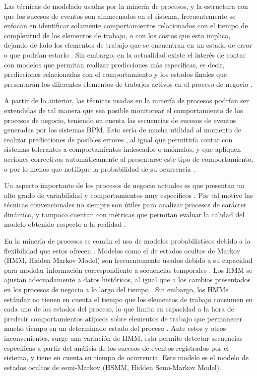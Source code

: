 Las técnicas de modelado usadas por la minería de procesos, y la estructura con que los sucesos de eventos son almacenados en el sistema, frecuentemente se enfocan en identificar solamente comportamientos relacionados con el tiempo de completitud de los elementos de trabajo, o con los costos que esto implica, dejando de lado los elementos de trabajo que se encuentran en un estado de error o que podrían estarlo \cite{VanDerAalst2011}. Sin embargo, en la actualidad existe el interés de contar con modelos que permitan realizar predicciones más específicas, es decir, predicciones relacionadas con el comportamiento y los estados finales que presentarán los diferentes elementos de trabajos activos en el proceso de negocio \cite{Camara2015}. 

A partir de lo anterior, las técnicas usadas en la minería de procesos podrían ser extendidas de tal manera que sea posible monitorear el comportamiento de los procesos de negocio, teniendo en cuenta las secuencias de sucesos de eventos generadas por los sistemas BPM. Esto sería de mucha utilidad al momento de realizar predicciones de posibles errores \cite{Kang2014}, al igual que permitiría contar con sistemas tolerantes a comportamientos indeseados o anómalos, y que apliquen acciones correctivas automáticamente al presentarse este tipo de comportamiento, o por lo menos que notifique la probabilidad de su ocurrencia \cite{Salfner2007,Yu2006}.

Un aspecto importante de los procesos de negocio actuales es que presentan un alto grado de variabilidad y comportamientos muy específicos \cite{Ferreira2007}. Por tal motivo las técnicas convencionales no siempre son útiles para analizar procesos de carácter dinámico, y tampoco cuentan con métricas que permitan evaluar la calidad del modelo obtenido respecto a la realidad \cite{Rozinat2008}.

En la minería de procesos es común el uso de modelos probabilísticos debido a la flexibilidad que estos ofrecen \cite{DaSilva2009}. Modelos como el de estados ocultos de Markov (HMM, Hidden Markov Model) son frecuentemente usados debido a su capacidad para modelar información correspondiente a secuencias temporales \cite{DaSilva2009}. Los HMM se ajustan adecuadamente a datos históricos, al igual que a los cambios presentados en los procesos de negocio a lo largo del tiempo \cite{Rozinat2008}. Sin embargo, los HMMs estándar no tienen en cuenta el tiempo que los elementos de trabajo consumen en cada uno de los estados del proceso, lo que limita su capacidad a la hora de predecir comportamientos atípicos sobre elementos de trabajo que permanecer mucho tiempo en un determinado estado del proceso \cite{DaSilva2009}. Ante estos y otros inconvenientes, surge una variación de HMM, esta permite detectar secuencias específicas a partir del análisis de los sucesos de eventos registrados por el sistema, y tiene en cuenta su tiempo de ocurrencia. Este modelo es el modelo de estados ocultos de semi-Markov (HSMM, Hidden Semi-Markov Model).

